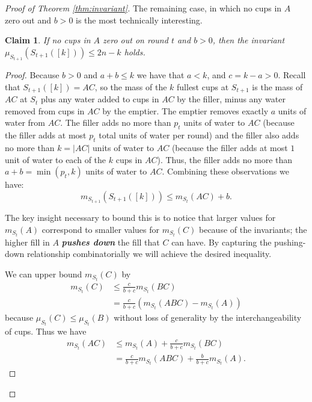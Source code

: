 \documentclass[twocolumn]{article}[10pt]
\newcommand{\defn}[1]{{\textit{\textbf{\boldmath #1}}}\xspace}
\newtheorem{clm}{Claim}
\begin{document}
\begin{proof}[Proof of Theorem \ref{thm:invariant}]
The remaining case, in which no cups in $A$ zero out and $b > 0$ is the most technically interesting.
\begin{clm}
  If no cups in $A$ zero out on round $t$ and $b > 0$, then the invariant $\mu_{S_{t+1}}(S_{t+1}([k])) \le 2n-k$ holds.
\end{clm}
\begin{proof}
Because $b>0$ and $a+b \le k$ we have that $a
< k$, and $c = k-a > 0$. Recall that $S_{t+1}([k]) = AC$, so the mass of the
$k$ fullest cups at $S_{t+1}$ is the mass of $AC$ at $S_t$ plus any water added
to cups in $AC$ by the filler, minus any water removed from cups in $AC$ by the
emptier. The emptier removes exactly $a$ units of water from $AC$.
The filler adds no more than $p_t$ units of water to $AC$ (because the filler
adds at most $p_t$ total units of water per round) and the filler also
adds no more than $k = |AC|$ units of water to $AC$ (because the filler adds
at most $1$ unit of water to each of the $k$ cups in $AC$).
Thus, the filler adds no more than $a+b = \min(p_t, k)$ units of water to $AC$.
Combining these observations we have:
\begin{equation}
m_{S_{t+1}}(S_{t+1}([k])) \le m_{S_t}(AC) + b.
\label{eq:emptiereptiessomestufffillerfillssomestuff}
\end{equation}

The key insight necessary to bound this is to notice that larger values for
$m_{S_t}(A)$ correspond to smaller values for $m_{S_t}(C)$ because of the
invariants; the higher fill in $A$ \defn{pushes down} the fill that $C$ can
have. By capturing the pushing-down relationship combinatorially we will achieve the desired inequality.

We can upper bound $m_{S_t}(C)$ by 
\begin{align*}
m_{S_t}(C) & \le \frac{c}{b+c}m_{S_t}(BC) \\
&= \frac{c}{b+c}(m_{S_t}(ABC) - m_{S_t}(A))
\end{align*}
 because
$\mu_{S_t}(C) \le \mu_{S_t}(B)$ without loss of generality by the
interchangeability of cups.
Thus we have 
\begin{align}
  m_{S_t}(AC) &\le m_{S_t}(A) + \frac{c}{b+c}m_{S_t}(BC)\label{eqn:BCdiscounted}\\
  &= \frac{c}{b+c}m_{S_t}(ABC) + \frac{b}{b+c}m_{S_t}(A)\label{eqn:redistributeA}.
\end{align}


\end{proof}
\end{proof}
\end{document}
